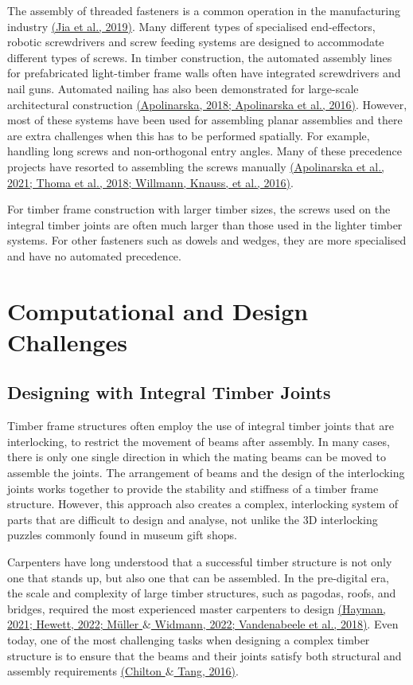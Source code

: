 The assembly of threaded fasteners is a common operation in the manufacturing industry \href{https://www.zotero.org/google-docs/?SLTLD9}{(Jia et al., 2019)}. Many different types of specialised end-effectors, robotic screwdrivers and screw feeding systems are designed to accommodate different types of screws. In timber construction, the automated assembly lines for prefabricated light-timber frame walls often have integrated screwdrivers and nail guns. Automated nailing has also been demonstrated for large-scale architectural construction \href{https://www.zotero.org/google-docs/?NCjCe0}{(Apolinarska, 2018; Apolinarska et al., 2016)}. However, most of these systems have been used for assembling planar assemblies and there are extra challenges when this has to be performed spatially. For example, handling long screws and non-orthogonal entry angles. Many of these precedence projects have resorted to assembling the screws manually \href{https://www.zotero.org/google-docs/?M7H4UY}{(Apolinarska et al., 2021; Thoma et al., 2018; Willmann, Knauss, et al., 2016)}. 

For timber frame construction with larger timber sizes, the screws used on the integral timber joints are often much larger than those used in the lighter timber systems. For other fasteners such as dowels and wedges, they are more specialised and have no automated precedence. 

\section{Computational and Design Challenges}

\subsection{Designing with Integral Timber Joints}

Timber frame structures often employ the use of integral timber joints that are interlocking, to restrict the movement of beams after assembly. In many cases, there is only one single direction in which the mating beams can be moved to assemble the joints. The arrangement of beams and the design of the interlocking joints works together to provide the stability and stiffness of a timber frame structure. However, this approach also creates a complex, interlocking system of parts that are difficult to design and analyse, not unlike the 3D interlocking puzzles commonly found in museum gift shops.

Carpenters have long understood that a successful timber structure is not only one that stands up, but also one that can be assembled. In the pre-digital era, the scale and complexity of large timber structures, such as pagodas, roofs, and bridges, required the most experienced master carpenters to design \href{https://www.zotero.org/google-docs/?FJwvT8}{(Hayman, 2021; Hewett, 2022; Müller $\&$ Widmann, 2022; Vandenabeele et al., 2018)}. Even today, one of the most challenging tasks when designing a complex timber structure is to ensure that the beams and their joints satisfy both structural and assembly requirements \href{https://www.zotero.org/google-docs/?cy6tn2}{(Chilton $\&$ Tang, 2016)}. 

